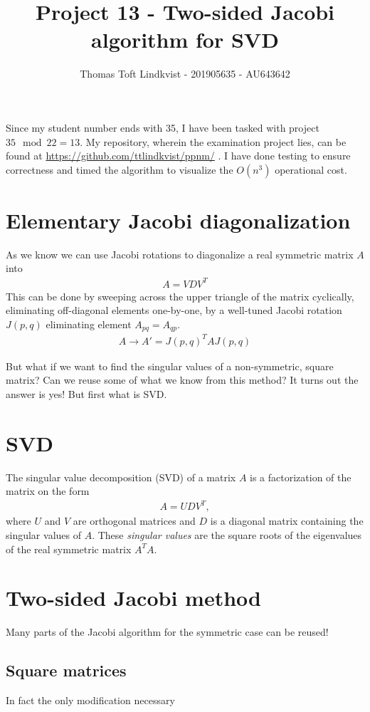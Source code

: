 \documentclass{article}
\title{Project 13 - Two-sided Jacobi algorithm for SVD}
\author{Thomas Toft Lindkvist - 201905635 - AU643642}
\date{}
\begin{document}
    \maketitle
    Since my student number ends with 35, I have been tasked with project $ 35 \mod 22 = 13 $.
    My repository, wherein the examination project lies, can be found at \url{https://github.com/ttlindkvist/ppnm/} .
    I have done testing to ensure correctness and timed the algorithm to visualize the $ O(n^3) $ operational cost.
    
    \section{Elementary Jacobi diagonalization}
    As we know we can use Jacobi rotations to diagonalize a real symmetric matrix $ A $ into
    \begin{align}
    	A = VDV^T
    \end{align}
	This can be done by sweeping across the upper triangle of the matrix cyclically, eliminating off-diagonal elements one-by-one, by a well-tuned Jacobi rotation $ J(p,q) $ eliminating element $ A_{pq}=A_{qp} $.
	\begin{align}
		A \to A' = J(p,q)^T A J(p,q)
	\end{align}
	
	But what if we want to find the singular values of a non-symmetric, square matrix? Can we reuse some of what we know from this method? It turns out the answer is yes! But first what is SVD.
	
	\section{SVD}
	The singular value decomposition (SVD) of a matrix $ A $ is a factorization of the matrix on the form
	\begin{align}
		A = UDV^T,
	\end{align}
	where $ U $ and $ V $ are orthogonal matrices and $ D $ is a diagonal matrix containing the singular values of $ A $. These \textit{singular values} are the square roots of the eigenvalues of the real symmetric matrix $ A^TA $.	
	
    
    \section{Two-sided Jacobi method}
    Many parts of the Jacobi algorithm for the symmetric case can be reused! 
    \subsection{Square matrices}
    In fact the only modification necessary 
    
\end{document}
